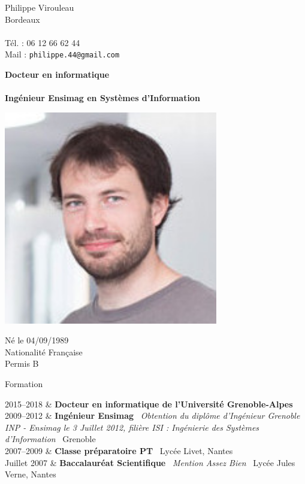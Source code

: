 \documentclass{cv}
\newcommand{\lieu}[1]{{#1}\ }
\newcommand{\activite}[1]{\textbf{#1}\ }
\newcommand{\comment}[1]{\textsl{#1}\ }
\begin{document}
\begin{chapeau}
\begin{adresse}
	Philippe Virouleau\\%
	Bordeaux\\%
	{\color{DarkGreen}{\ligne}}\\%
	Tél. : 06 12 66 62 44\\%
	Mail : \texttt{philippe.44@gmail.com}
\end{adresse}
\begin{titre}
\textbf{Docteur en informatique\\~\\
  Ingénieur Ensimag en Systèmes d'Information}
\end{titre}
\begin{etatcivil}
\includegraphics[width=0.7\textwidth]{philippe.png}

	Né le 04/09/1989\\
	Nationalité Française\\
	Permis B
\end{etatcivil}
\end{chapeau}





\begin{rubriquetableau}[3cm]{Formation}



2015--2018
	& \activite{Docteur en informatique de l'Université Grenoble-Alpes}\\

2009--2012
	& \activite{Ingénieur Ensimag}
	\comment{Obtention du diplôme d'Ingénieur Grenoble INP - Ensimag le 3 Juillet 2012, filière ISI : Ingénierie des Systèmes d'Information}
	\lieu{Grenoble}\\

2007--2009
	& \activite{Classe préparatoire PT}
	\lieu{Lycée Livet, Nantes}\\
Juillet 2007
	& \activite{Baccalauréat Scientifique}
	\comment{Mention Assez Bien}
	\lieu{Lycée Jules Verne, Nantes}\\


\end{rubriquetableau}
\end{document}
